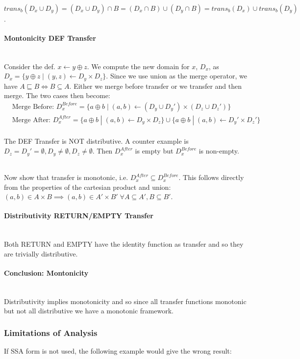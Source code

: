 \documentclass[a4paper]{article}
\newcommand{\NL}[0]{ \hfill\\\noindent }
\begin{document}
\NL
$trans_b(D_x \cup D_y) = (D_x \cup D_y) \cap B = (D_x \cap B) \cup (D_y \cap B) = trans_b(D_x) \cup trans_b(D_y)$.

\paragraph{Montonicity DEF Transfer}\NL
Consider the def. $x \leftarrow y \oplus z$. We compute the new domain for $x$, $D_x$, as $D_x = \{ y \oplus z \;|\; (y,z) \leftarrow D_y \times D_z\}$. Since we use union as the merge operator, we have $A \sqsubseteq B \iff B \subseteq A$. Either we merge before transfer or we transfer and then merge. The two cases then become:
\begin{align*}
&\text{Merge Before: } D_x^{Before} = \{a \oplus b \; | \; (a, b) \leftarrow (D_y \cup D_y') \times (D_z \cup D_z') \} \\
&\text{Merge After: } D_x^{After} = \{a \oplus b \; | \; (a, b) \leftarrow D_y \times D_z \} \cup \{a \oplus b \; | \; (a, b) \leftarrow D_y' \times D_z' \}
\end{align*}
\NL
The DEF Transfer is NOT distributive. A counter example is $D_z = D_y' = \emptyset, D_y\neq \emptyset, D_z \neq \emptyset$. Then $D_x^{After}$ is empty but $D_x^{Before}$ is non-empty. 

\NL
Now show that transfer is monotonic, i.e. $D_x^{After} \subseteq D_x^{Before}$. This follows directly from the properties of the cartesian product and union: $(a,b) \in A \times B \implies (a,b) \in A' \times B' \;\forall A \subseteq A', B \subseteq B'$.

\paragraph{Distributivity RETURN/EMPTY Transfer}\NL
Both RETURN and EMPTY have the identity function as transfer and so they are trivially distributive.

\paragraph{Conclusion: Montonicity}\NL
Distributivity implies monotonicity and so since all transfer functions monotonic but not all distributive we have a monotonic framework. 

\subsubsection{Limitations of Analysis}
If SSA form is not used, the following example would give the wrong result:
\end{document}
